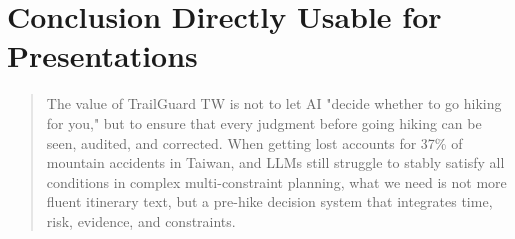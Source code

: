 \documentclass[conference]{IEEEtran}
\begin{document}
\section{Conclusion Directly Usable for Presentations}

\begin{quote}
The value of TrailGuard TW is not to let AI "decide whether to go hiking for you," but to ensure that every judgment before going hiking can be seen, audited, and corrected. When getting lost accounts for 37\% of mountain accidents in Taiwan, and LLMs still struggle to stably satisfy all conditions in complex multi-constraint planning, what we need is not more fluent itinerary text, but a pre-hike decision system that integrates time, risk, evidence, and constraints.
\end{quote}
\end{document}
